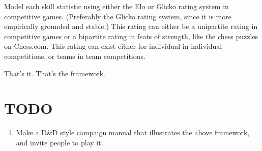\documentclass[11pt]{article}
\begin{document}
Model each skill statistic using either the Elo or Glicko rating
system in competitive games. (Preferably the Glicko rating system,
since it is more empirically grounded and stable.) This rating can
either be a unipartite rating in competitive games or a bipartite
rating in feats of strength, like the chess puzzles on Chess.com.
This rating can exist either for individual in individual
competitions, or teams in team competitions.

That's it. That's the framework.

\section{TODO}

\begin{enumerate}
\item Make a D\&D style campaign manual that illustrates the above
  framework, and invite people to play it.

\end{enumerate}
\end{document}
